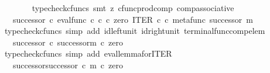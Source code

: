 \begin{isabellebody}
\ \ \ \ \ \ \isamarkupfalse%
\ {\isacharparenleft}{\kern0pt}typecheck{\isacharunderscore}{\kern0pt}cfuncs{\isacharcomma}{\kern0pt}\ smt\ {\isacharparenleft}{\kern0pt}z{}{\isacharparenright}{\kern0pt}\ cfunc{\isacharunderscore}{\kern0pt}prod{\isacharunderscore}{\kern0pt}comp\ comp{\isacharunderscore}{\kern0pt}associative{}{\isacharparenright}{\kern0pt}\isanewline
\ \ \ \ \isamarkupfalse%
\ \isamarkupfalse%
\ {\isachardoublequoteopen}{\isachardot}{\kern0pt}{\isachardot}{\kern0pt}{\isachardot}{\kern0pt}\ {\isacharequal}{\kern0pt}\ successor\ {\isasymcirc}\isactrlsub c\ eval{\isacharunderscore}{\kern0pt}func\ {\isasymnat}\isactrlsub c\ {\isasymnat}\isactrlsub c\ {\isasymcirc}\isactrlsub c\ {\isasymlangle}zero\ {\isacharcomma}{\kern0pt}ITER\ {\isasymnat}\isactrlsub c\ {\isasymcirc}\isactrlsub c\ {\isasymlangle}metafunc\ successor\ {\isacharcomma}{\kern0pt}m{\isasymrangle}{\isasymrangle}{\isachardoublequoteclose}\isanewline
\ \ \ \ \ \ \isamarkupfalse%
\ {\isacharparenleft}{\kern0pt}typecheck{\isacharunderscore}{\kern0pt}cfuncs{\isacharcomma}{\kern0pt}\ simp\ add{\isacharcolon}{\kern0pt}\ id{\isacharunderscore}{\kern0pt}left{\isacharunderscore}{\kern0pt}unit{}\ id{\isacharunderscore}{\kern0pt}right{\isacharunderscore}{\kern0pt}unit{}\ terminal{\isacharunderscore}{\kern0pt}func{\isacharunderscore}{\kern0pt}comp{\isacharunderscore}{\kern0pt}elem{\isacharparenright}{\kern0pt}\isanewline
\ \ \ \ \isamarkupfalse%
\ \isamarkupfalse%
\ {\isachardoublequoteopen}{\isachardot}{\kern0pt}{\isachardot}{\kern0pt}{\isachardot}{\kern0pt}\ {\isacharequal}{\kern0pt}\ successor\ {\isasymcirc}\isactrlsub c\ {\isacharparenleft}{\kern0pt}successor\isactrlbsup {\isasymcirc}m\isactrlesup {\isacharparenright}{\kern0pt}\ {\isasymcirc}\isactrlsub c\ zero{\isachardoublequoteclose}\isanewline
\ \ \ \ \ \ \isamarkupfalse%
\ {\isacharparenleft}{\kern0pt}typecheck{\isacharunderscore}{\kern0pt}cfuncs{\isacharcomma}{\kern0pt}\ simp\ add{\isacharcolon}{\kern0pt}\ eval{\isacharunderscore}{\kern0pt}lemma{\isacharunderscore}{\kern0pt}for{\isacharunderscore}{\kern0pt}ITER{\isacharparenright}{\kern0pt}\isanewline
\ \ \ \ \isamarkupfalse%
\ \isamarkupfalse%
\ {\isachardoublequoteopen}{\isachardot}{\kern0pt}{\isachardot}{\kern0pt}{\isachardot}{\kern0pt}\ {\isacharequal}{\kern0pt}\ {\isacharparenleft}{\kern0pt}successor\isactrlbsup {\isasymcirc}successor\ {\isasymcirc}\isactrlsub c\ m\isactrlesup {\isacharparenright}{\kern0pt}\ {\isasymcirc}\isactrlsub c\ zero{\isachardoublequoteclose}\isanewline

\end{isabellebody}
